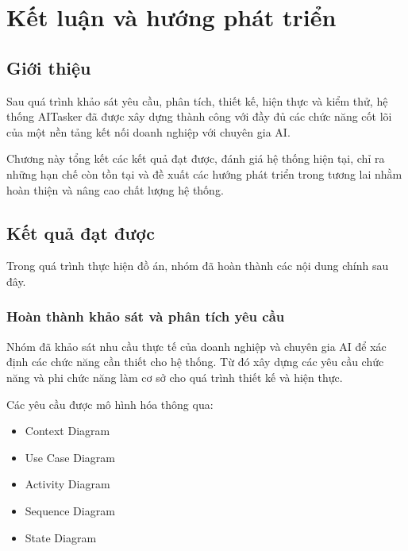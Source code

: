 
\chapter{Kết luận và hướng phát triển}
\label{chap:conclusion}

\section{Giới thiệu}

Sau quá trình khảo sát yêu cầu, phân tích, thiết kế, hiện thực và kiểm thử, hệ thống AITasker đã được xây dựng thành công với đầy đủ các chức năng cốt lõi của một nền tảng kết nối doanh nghiệp với chuyên gia AI.

Chương này tổng kết các kết quả đạt được, đánh giá hệ thống hiện tại, chỉ ra những hạn chế còn tồn tại và đề xuất các hướng phát triển trong tương lai nhằm hoàn thiện và nâng cao chất lượng hệ thống.

\section{Kết quả đạt được}

Trong quá trình thực hiện đồ án, nhóm đã hoàn thành các nội dung chính sau đây.

\subsection{Hoàn thành khảo sát và phân tích yêu cầu}

Nhóm đã khảo sát nhu cầu thực tế của doanh nghiệp và chuyên gia AI để xác định các chức năng cần thiết cho hệ thống. Từ đó xây dựng các yêu cầu chức năng và phi chức năng làm cơ sở cho quá trình thiết kế và hiện thực.

Các yêu cầu được mô hình hóa thông qua:

\begin{itemize}
\item Context Diagram
\item Use Case Diagram
\item Activity Diagram
\item Sequence Diagram
\item State Diagram
\end{itemize}

